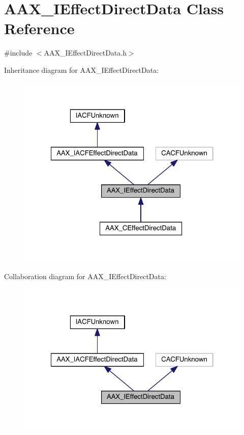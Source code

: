 \hypertarget{a00097}{}\section{A\+A\+X\+\_\+\+I\+Effect\+Direct\+Data Class Reference}
\label{a00097}


{\ttfamily \#include $<$A\+A\+X\+\_\+\+I\+Effect\+Direct\+Data.\+h$>$}



Inheritance diagram for A\+A\+X\+\_\+\+I\+Effect\+Direct\+Data\+:
\nopagebreak
\begin{figure}[H]
\begin{center}
\leavevmode
\includegraphics[width=322pt]{a00624}
\end{center}
\end{figure}


Collaboration diagram for A\+A\+X\+\_\+\+I\+Effect\+Direct\+Data\+:
\nopagebreak
\begin{figure}[H]
\begin{center}
\leavevmode
\includegraphics[width=322pt]{a00625}
\end{center}
\end{figure}


